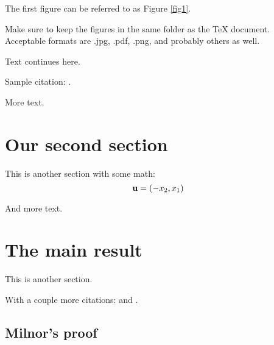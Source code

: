 \documentclass{amsart}
\theoremstyle{definition}
\numberwithin{equation}{section}
\def\ve#1{{\bf #1}}
\begin{document}
\begin{sansmath}
%





The first figure can be referred to as  Figure \ref{fig1}.

Make sure to keep the figures in the same folder as the TeX document.
Acceptable formats are .jpg, .pdf, .png, and probably others as well.

Text continues here.

Sample citation:  \cite{alexandrov}.

More text.

\section{Our second section}

This is another section
with some math:
    $$ \ve u = (-x_2, x_1) $$


And more text.
    \medskip



\section{The main result}

This is another section.

With a couple more citations:
 \cite{alexandrov} and
 \cite{milnor}.


    \bigskip


\subsection{Milnor's proof}


\end{sansmath}
\end{document}
